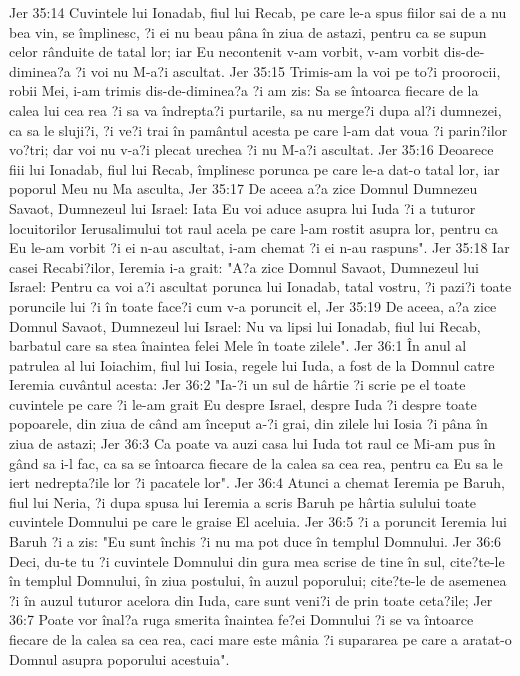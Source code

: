 Jer 35:14  Cuvintele lui Ionadab, fiul lui Recab, pe care le-a spus fiilor sai de a nu bea vin, se împlinesc, ?i ei nu beau pâna în ziua de astazi, pentru ca se supun celor rânduite de tatal lor; iar Eu necontenit v-am vorbit, v-am vorbit dis-de-diminea?a ?i voi nu M-a?i ascultat.
Jer 35:15  Trimis-am la voi pe to?i proorocii, robii Mei, i-am trimis dis-de-diminea?a ?i am zis: Sa se întoarca fiecare de la calea lui cea rea ?i sa va îndrepta?i purtarile, sa nu merge?i dupa al?i dumnezei, ca sa le sluji?i, ?i ve?i trai în pamântul acesta pe care l-am dat voua ?i parin?ilor vo?tri; dar voi nu v-a?i plecat urechea ?i nu M-a?i ascultat.
Jer 35:16  Deoarece fiii lui Ionadab, fiul lui Recab, împlinesc porunca pe care le-a dat-o tatal lor, iar poporul Meu nu Ma asculta,
Jer 35:17  De aceea a?a zice Domnul Dumnezeu Savaot, Dumnezeul lui Israel: Iata Eu voi aduce asupra lui Iuda ?i a tuturor locuitorilor Ierusalimului tot raul acela pe care l-am rostit asupra lor, pentru ca Eu le-am vorbit ?i ei n-au ascultat, i-am chemat ?i ei n-au raspuns".
Jer 35:18  Iar casei Recabi?ilor, Ieremia i-a grait: "A?a zice Domnul Savaot, Dumnezeul lui Israel: Pentru ca voi a?i ascultat porunca lui Ionadab, tatal vostru, ?i pazi?i toate poruncile lui ?i în toate face?i cum v-a poruncit el,
Jer 35:19  De aceea, a?a zice Domnul Savaot, Dumnezeul lui Israel: Nu va lipsi lui Ionadab, fiul lui Recab, barbatul care sa stea înaintea felei Mele în toate zilele".
Jer 36:1  În anul al patrulea al lui Ioiachim, fiul lui Iosia, regele lui Iuda, a fost de la Domnul catre Ieremia cuvântul acesta:
Jer 36:2  "Ia-?i un sul de hârtie ?i scrie pe el toate cuvintele pe care ?i le-am grait Eu despre Israel, despre Iuda ?i despre toate popoarele, din ziua de când am început a-?i grai, din zilele lui Iosia ?i pâna în ziua de astazi;
Jer 36:3  Ca poate va auzi casa lui Iuda tot raul ce Mi-am pus în gând sa i-l fac, ca sa se întoarca fiecare de la calea sa cea rea, pentru ca Eu sa le iert nedrepta?ile lor ?i pacatele lor".
Jer 36:4  Atunci a chemat Ieremia pe Baruh, fiul lui Neria, ?i dupa spusa lui Ieremia a scris Baruh pe hârtia sulului toate cuvintele Domnului pe care le graise El aceluia.
Jer 36:5  ?i a poruncit Ieremia lui Baruh ?i a zis: "Eu sunt închis ?i nu ma pot duce în templul Domnului.
Jer 36:6  Deci, du-te tu ?i cuvintele Domnului din gura mea scrise de tine în sul, cite?te-le în templul Domnului, în ziua postului, în auzul poporului; cite?te-le de asemenea ?i în auzul tuturor acelora din Iuda, care sunt veni?i de prin toate ceta?ile;
Jer 36:7  Poate vor înal?a ruga smerita înaintea fe?ei Domnului ?i se va întoarce fiecare de la calea sa cea rea, caci mare este mânia ?i supararea pe care a aratat-o Domnul asupra poporului acestuia".
